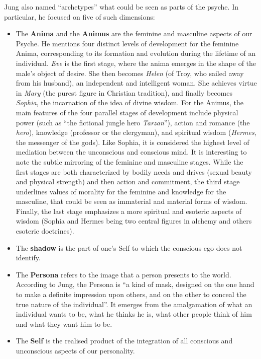 \documentclass[
]{book}
\providecommand{\tightlist}{%
  \setlength{\itemsep}{0pt}\setlength{\parskip}{0pt}}
\begin{document}
Jung also named ``archetypes'' what could be seen as parts of the psyche. In particular, he focused on five of such dimensions:

\begin{itemize}
\tightlist
\item
  The \textbf{Anima} and the \textbf{Animus} are the feminine and masculine aspects of our Psyche. He mentions four distinct levels of development for the feminine Anima, corresponding to its formation and evolution during the lifetime of an individual. \emph{Eve} is the first stage, where the anima emerges in the shape of the male's object of desire. She then becomes \emph{Helen} (of Troy, who sailed away from his husband), an independent and intelligent woman. She achieves virtue in \emph{Mary} (the purest figure in Christian tradition), and finally becomes \emph{Sophia}, the incarnation of the idea of divine wisdom. For the Animus, the main features of the four parallel stages of development include physical power (such as ``the fictional jungle hero \emph{Tarzan}''), action and romance (the \emph{hero}), knowledge (professor or the clergyman), and spiritual wisdom (\emph{Hermes}, the messenger of the gods). Like Sophia, it is considered the highest level of mediation between the unconscious and conscious mind. It is interesting to note the subtle mirroring of the feminine and masculine stages. While the first stages are both characterized by bodily needs and drives (sexual beauty and physical strength) and then action and commitment, the third stage underlines values of morality for the feminine and knowledge for the masculine, that could be seen as immaterial and material forms of wisdom. Finally, the last stage emphasizes a more spiritual and esoteric aspects of wisdom (Sophia and Hermes being two central figures in alchemy and others esoteric doctrines).
\end{itemize}

\begin{itemize}
\tightlist
\item
  The \textbf{shadow} is the part of one's Self to which the conscious ego does not identify.
\item
  The \textbf{Persona} refers to the image that a person presents to the world. According to Jung, the Persona is ``a kind of mask, designed on the one hand to make a definite impression upon others, and on the other to conceal the true nature of the individual''. It emerges from the amalgamation of what an individual wants to be, what he thinks he is, what other people think of him and what they want him to be.
\item
  The \textbf{Self} is the realised product of the integration of all conscious and unconscious aspects of our personality.
\end{itemize}
\end{document}
